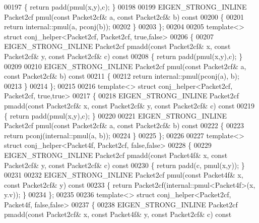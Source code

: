 \begin{DoxyCode}
00197 \textcolor{keyword}{  }\{ \textcolor{keywordflow}{return} padd(pmul(x,y),c); \}
00198 
00199   EIGEN\_STRONG\_INLINE Packet2cf pmul(\textcolor{keyword}{const} Packet2cf& a, \textcolor{keyword}{const} Packet2cf& b)\textcolor{keyword}{ const}
00200 \textcolor{keyword}{  }\{
00201     \textcolor{keywordflow}{return} internal::pmul(a, pconj(b));
00202   \}
00203 \};
00204 
00205 \textcolor{keyword}{template}<> \textcolor{keyword}{struct }conj\_helper<Packet2cf, Packet2cf, true,false>
00206 \{
00207   EIGEN\_STRONG\_INLINE Packet2cf pmadd(\textcolor{keyword}{const} Packet2cf& x, \textcolor{keyword}{const} Packet2cf& y, \textcolor{keyword}{const} Packet2cf& c)\textcolor{keyword}{ const}
00208 \textcolor{keyword}{  }\{ \textcolor{keywordflow}{return} padd(pmul(x,y),c); \}
00209 
00210   EIGEN\_STRONG\_INLINE Packet2cf pmul(\textcolor{keyword}{const} Packet2cf& a, \textcolor{keyword}{const} Packet2cf& b)\textcolor{keyword}{ const}
00211 \textcolor{keyword}{  }\{
00212     \textcolor{keywordflow}{return} internal::pmul(pconj(a), b);
00213   \}
00214 \};
00215 
00216 \textcolor{keyword}{template}<> \textcolor{keyword}{struct }conj\_helper<Packet2cf, Packet2cf, true,true>
00217 \{
00218   EIGEN\_STRONG\_INLINE Packet2cf pmadd(\textcolor{keyword}{const} Packet2cf& x, \textcolor{keyword}{const} Packet2cf& y, \textcolor{keyword}{const} Packet2cf& c)\textcolor{keyword}{ const}
00219 \textcolor{keyword}{  }\{ \textcolor{keywordflow}{return} padd(pmul(x,y),c); \}
00220 
00221   EIGEN\_STRONG\_INLINE Packet2cf pmul(\textcolor{keyword}{const} Packet2cf& a, \textcolor{keyword}{const} Packet2cf& b)\textcolor{keyword}{ const}
00222 \textcolor{keyword}{  }\{
00223     \textcolor{keywordflow}{return} pconj(internal::pmul(a, b));
00224   \}
00225 \};
00226 
00227 \textcolor{keyword}{template}<> \textcolor{keyword}{struct }conj\_helper<Packet4f, Packet2cf, false,false>
00228 \{
00229   EIGEN\_STRONG\_INLINE Packet2cf pmadd(\textcolor{keyword}{const} Packet4f& x, \textcolor{keyword}{const} Packet2cf& y, \textcolor{keyword}{const} Packet2cf& c)\textcolor{keyword}{ const}
00230 \textcolor{keyword}{  }\{ \textcolor{keywordflow}{return} padd(c, pmul(x,y)); \}
00231 
00232   EIGEN\_STRONG\_INLINE Packet2cf pmul(\textcolor{keyword}{const} Packet4f& x, \textcolor{keyword}{const} Packet2cf& y)\textcolor{keyword}{ const}
00233 \textcolor{keyword}{  }\{ \textcolor{keywordflow}{return} Packet2cf(internal::pmul<Packet4f>(x, y.v)); \}
00234 \};
00235 
00236 \textcolor{keyword}{template}<> \textcolor{keyword}{struct }conj\_helper<Packet2cf, Packet4f, false,false>
00237 \{
00238   EIGEN\_STRONG\_INLINE Packet2cf pmadd(\textcolor{keyword}{const} Packet2cf& x, \textcolor{keyword}{const} Packet4f& y, \textcolor{keyword}{const} Packet2cf& c)\textcolor{keyword}{ const}

\end{DoxyCode}
